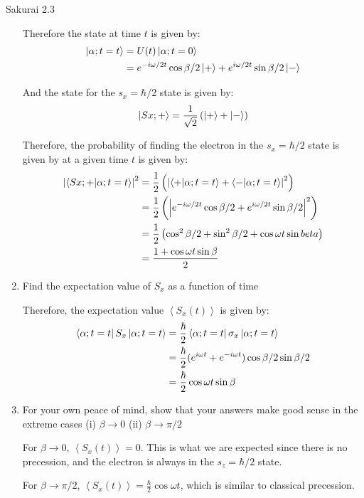 \documentclass{article}
\newcommand{\expc}[1]{\left<#1\right>}
\begin{document}
\begin{section}{Sakurai 2.3}
\begin{enumerate}
\begin{tcolorbox}[breakable]
		Therefore the state at time $t$ is given by:
		\begin{align*}
			\ket{\alpha; t=t} & = U(t) \ket{\alpha; t=0}                                                               \\
			                  & = e^{-i \omega/2 t} \cos{\beta / 2} \ket{+} + e^{i \omega/2 t} \sin{\beta / 2} \ket{-}
		\end{align*}

		And the state for the $s_x = \hbar/2$ state is given by:
		\begin{align*}
			\ket{Sx; +} = \frac{1}{\sqrt{2}} \left( \ket{+} + \ket{-} \right)
		\end{align*}

		Therefore, the probability of finding the electron in the $s_x = \hbar/2$ state is given by at a given time $t$ is given by:
		\begin{align*}
			\abs{\bra{Sx; +} \ket{\alpha; t=t}}^2
			 & = \frac{1}{2} \left( \abs{\bra{+} \ket{\alpha; t=t} + \bra{-} \ket{\alpha; t=t}}^2 \right)                 \\
			 & = \frac{1}{2} \left( \abs{ e^{-i \omega/2 t} \cos{\beta / 2} + e^{i \omega/2 t} \sin{\beta / 2}}^2 \right) \\
			 & = \frac{1}{2} \left( \cos^2{\beta/2} + \sin^2{\beta/2} + \cos{\omega t} \sin{beta} \right)                 \\
			 & = \frac{1 + \cos{\omega t} \sin{\beta} }{2}
		\end{align*}
	\end{tcolorbox}

	\item Find the expectation value of $S_x$ as a function of time

	\begin{tcolorbox}
		Therefore, the expectation value $\expc{S_x (t)}$ is given by:
		\begin{align*}
			\bra{\alpha; t=t} S_x \ket{\alpha; t=t}
			 & = \frac{\hbar}{2} \bra{\alpha; t=t} \sigma_x \ket{\alpha; t=t}                   \\
			 & = \frac{\hbar}{2} (e^{i \omega t} + e^{-i \omega t}) \cos{\beta/2} \sin{\beta/2} \\
			 & = \frac{\hbar}{2} \cos{\omega t} \sin{\beta}
		\end{align*}
	\end{tcolorbox}

	\item For your own peace of mind, show that your answers make good sense in the extreme cases (i) $\beta \to 0$ (ii) $\beta \to \pi/2$

	\begin{tcolorbox}
		For $\beta \to 0$, $\expc{S_x (t)} = 0$. This is what we are expected since there is no precession, and the electron is always in the $s_z = \hbar/2$ state.

		For $\beta \to \pi/2$, $\expc{S_x (t)} = \frac{\hbar}{2} \cos{\omega t}$, which is similar to classical precession.
	\end{tcolorbox}
\end{enumerate}
\end{section}
\end{document}
